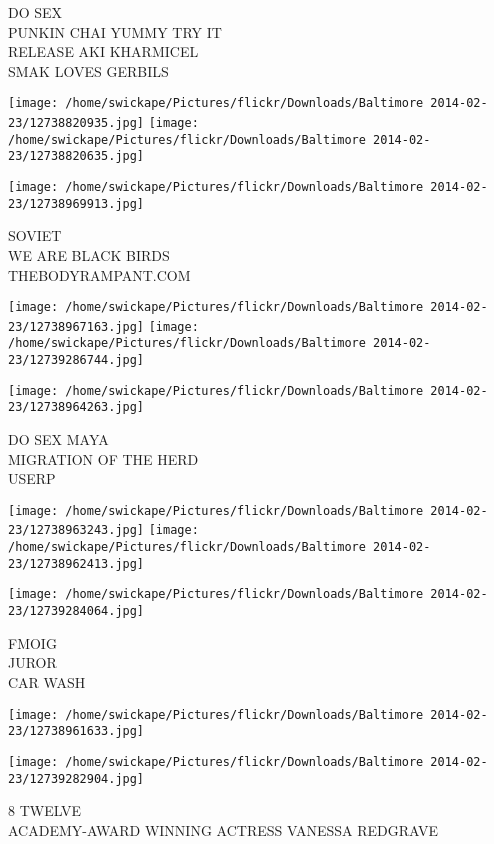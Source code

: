 \documentclass[10pt,letterpaper]{article}
\begin{document}
DO SEX\\
PUNKIN CHAI YUMMY TRY IT\\
RELEASE AKI KHARMICEL\\
SMAK LOVES GERBILS\\
\pagebreak

\texttt{[image: /home/swickape/Pictures/flickr/Downloads/Baltimore 2014-02-23/12738820935.jpg]}
\texttt{[image: /home/swickape/Pictures/flickr/Downloads/Baltimore 2014-02-23/12738820635.jpg]}

\vspace{0.25in}
\texttt{[image: /home/swickape/Pictures/flickr/Downloads/Baltimore 2014-02-23/12738969913.jpg]}

SOVIET\\
WE ARE BLACK BIRDS\\
THEBODYRAMPANT.COM\\
\pagebreak

\texttt{[image: /home/swickape/Pictures/flickr/Downloads/Baltimore 2014-02-23/12738967163.jpg]}
\texttt{[image: /home/swickape/Pictures/flickr/Downloads/Baltimore 2014-02-23/12739286744.jpg]}

\vspace{0.25in}
\texttt{[image: /home/swickape/Pictures/flickr/Downloads/Baltimore 2014-02-23/12738964263.jpg]}

DO SEX MAYA\\
MIGRATION OF THE HERD\\
USERP\\
\pagebreak

\texttt{[image: /home/swickape/Pictures/flickr/Downloads/Baltimore 2014-02-23/12738963243.jpg]}
\texttt{[image: /home/swickape/Pictures/flickr/Downloads/Baltimore 2014-02-23/12738962413.jpg]}

\texttt{[image: /home/swickape/Pictures/flickr/Downloads/Baltimore 2014-02-23/12739284064.jpg]}

FMOIG\\
JUROR\\
CAR WASH\\
\pagebreak

\texttt{[image: /home/swickape/Pictures/flickr/Downloads/Baltimore 2014-02-23/12738961633.jpg]}

\vspace{0.25in}
\texttt{[image: /home/swickape/Pictures/flickr/Downloads/Baltimore 2014-02-23/12739282904.jpg]}

8 TWELVE\\
ACADEMY{-}AWARD WINNING ACTRESS VANESSA REDGRAVE\\
\pagebreak
\end{document}

